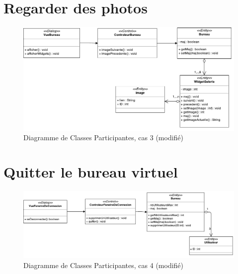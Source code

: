 \section{Regarder des photos}
\begin{figure}[H]
	\centering
	\includegraphics[angle=90]{diagrammes/DCP4.pdf}
	\caption{\color{green}Diagramme de Classes Participantes, cas 3 (modifié)\color{black}}
\end{figure}

\section{Quitter le bureau virtuel}

\begin{figure}[H]
	\centering
	\includegraphics[angle=90]{diagrammes/DCP5.pdf}
	\caption{\color{green}Diagramme de Classes Participantes, cas 4 (modifié)\color{black}}
\end{figure}